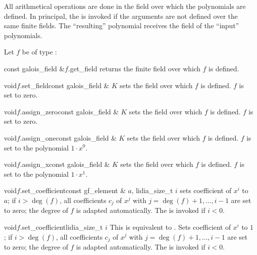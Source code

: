 
\BASIC

All arithmetical operations are done in the field over which the polynomials are defined.  In
principal, the \LEH is invoked if the  arguments are not defined over the same finite
fields.  The ``resulting'' polynomial receives the field of the ``input'' polynomials.

Let $f$ be of type :

\begin{cfcode}{const galois_field &}{$f$.get_field}{}
  returns the finite field over which $f$ is defined.
\end{cfcode}

\begin{fcode}{void}{$f$.set_field}{const galois_field & $K$}
  sets the field over which $f$ is defined.  $f$ is set to zero.
\end{fcode}

\begin{fcode}{void}{$f$.assign_zero}{const galois_field & $K$}
  sets the field over which $f$ is defined.  $f$ is set to zero.
\end{fcode}

\begin{fcode}{void}{$f$.assign_one}{const galois_field & $K$}
  sets the field over which $f$ is defined.  $f$ is set to the polynomial $1 \cdot x^0$.
\end{fcode}

\begin{fcode}{void}{$f$.assign_x}{const galois_field & $K$}
  sets the field over which $f$ is defined.  $f$ is set to the polynomial $1 \cdot x^1$.
\end{fcode}

\begin{fcode}{void}{$f$.set_coefficient}{const gf_element & $a$, lidia_size_t $i$}
  sets coefficient of $x^i$ to $a$; if $i > \deg(f)$, all coefficients $c_j$ of $x^j$
  with $j = \deg(f)+1, \dots, i-1$ are set to zero; the degree of $f$ is adapted automatically.
  The \LEH is invoked if $i < 0$.
\end{fcode}

\begin{fcode}{void}{$f$.set_coefficient}{lidia_size_t $i$}
  This is equivalent to .  Sets coefficient of $x^i$ to $1$; if
  $i > \deg(f)$, all coefficients $c_j$ of $x^j$ with $j = \deg(f)+1, \dots, i-1$ are set to
  zero; the degree of $f$ is adapted automatically.  The \LEH is invoked if $i < 0$.
\end{fcode}



